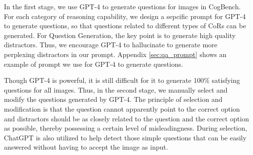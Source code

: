 In the first stage, we use GPT-4 \cite{openai2023gpt4} to generate questions for images in CogBench. 
For each category of reasoning capability, we design a sepcific prompt for GPT-4 to generate questions, so that questions related to different types of CoRs can be generated.
For Question Generation, the key point is to generate high quality distractors. 
Thus, we encourage GPT-4 to hallucinate to generate more perplexing distractors in our prompt. 
Appendix \ref{sec:qa_prompt} shows an example of prompt we use for GPT-4 to generate questions.

Though GPT-4 is powerful, it is still difficult for it to generate 100\% satisfying questions for all images.
Thus, in the second stage, we manually select and modify the questions generated by GPT-4.
The principle of selection and modification is that the question cannot apparently point to the correct option and distractors should be as closely related to the question and the correct option as possible, thereby possessing a certain level of misleadingness.
During selection, ChatGPT is also utilized to help detect those simple questions that can be easily answered without having to accept the image as input. 



